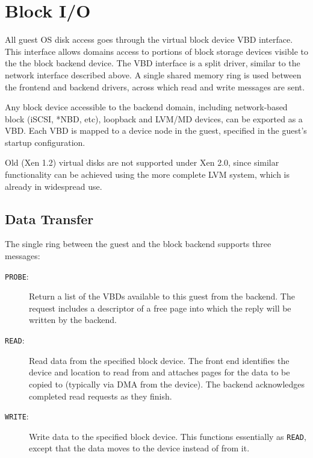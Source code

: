 \documentclass[11pt,twoside,final,openright]{report}
\begin{document}
\section{Block I/O}

All guest OS disk access goes through the virtual block device VBD
interface.  This interface allows domains access to portions of block
storage devices visible to the the block backend device.  The VBD
interface is a split driver, similar to the network interface
described above.  A single shared memory ring is used between the
frontend and backend drivers, across which read and write messages are
sent.

Any block device accessible to the backend domain, including
network-based block (iSCSI, *NBD, etc), loopback and LVM/MD devices,
can be exported as a VBD.  Each VBD is mapped to a device node in the
guest, specified in the guest's startup configuration.

Old (Xen 1.2) virtual disks are not supported under Xen 2.0, since
similar functionality can be achieved using the more complete LVM
system, which is already in widespread use.

\subsection{Data Transfer}

The single ring between the guest and the block backend supports three
messages:

\begin{description}
\item [{\small {\tt PROBE}}:] Return a list of the VBDs available to this guest
  from the backend.  The request includes a descriptor of a free page
  into which the reply will be written by the backend.

\item [{\small {\tt READ}}:] Read data from the specified block device.  The
  front end identifies the device and location to read from and
  attaches pages for the data to be copied to (typically via DMA from
  the device).  The backend acknowledges completed read requests as
  they finish.

\item [{\small {\tt WRITE}}:] Write data to the specified block device.  This
  functions essentially as {\small {\tt READ}}, except that the data moves to
  the device instead of from it.
\end{description}

\end{document}

